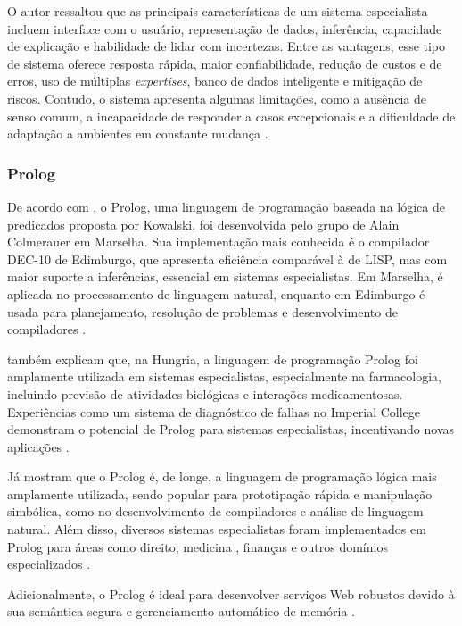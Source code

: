 O autor \textcite{jimmysingla} ressaltou que as principais características de um sistema especialista incluem interface com o usuário, representação de dados, inferência, capacidade de explicação e habilidade de lidar com incertezas. Entre as vantagens, esse tipo de sistema oferece resposta rápida, maior confiabilidade, redução de custos e de erros, uso de múltiplas \textit{expertises}, banco de dados inteligente e mitigação de riscos. Contudo, o sistema apresenta algumas limitações, como a ausência de senso comum, a incapacidade de responder a casos excepcionais e a dificuldade de adaptação a ambientes em constante mudança \cite{jimmysingla}. 

\subsubsection{Prolog}

De acordo com \textcite{keithclark}, o Prolog, uma linguagem de programação baseada na lógica de predicados proposta por Kowalski, foi desenvolvida pelo grupo de Alain Colmerauer em Marselha. Sua implementação mais conhecida é o compilador DEC-10 de Edimburgo, que apresenta eficiência comparável à de LISP, mas com maior suporte a inferências, essencial em sistemas especialistas. Em Marselha, é aplicada no processamento de linguagem natural, enquanto em Edimburgo é usada para planejamento, resolução de problemas e desenvolvimento de compiladores \cite{keithclark}.

\textcite{keithclark} também explicam que, na Hungria, a linguagem de programação Prolog foi amplamente utilizada em sistemas especialistas, especialmente na farmacologia, incluindo previsão de atividades biológicas e interações medicamentosas. Experiências como um sistema de diagnóstico de falhas no Imperial College demonstram o potencial de Prolog para sistemas especialistas, incentivando novas aplicações \cite{keithclark} .

Já \textcite{stuartrussel} mostram que o Prolog é, de longe, a linguagem de programação lógica mais amplamente utilizada, sendo popular para prototipação rápida e manipulação simbólica, como no desenvolvimento de compiladores e análise de linguagem natural. Além disso, diversos sistemas especialistas foram implementados em Prolog para áreas como direito, medicina \cite{jimmysingla}, finanças e outros domínios especializados \cite{stuartrussel}.

Adicionalmente, o Prolog é ideal para desenvolver serviços Web robustos devido à sua semântica segura e gerenciamento automático de memória \cite{wielemaker}.

